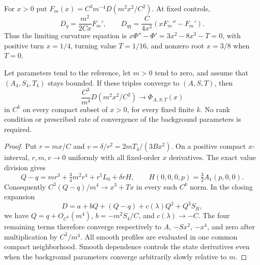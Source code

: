 For $x>0$ put $F_m(x)=C^3m^{-4}D(m^2x^2/C^2)$. At fixed controls,
\[
 D_q=\frac{m^2}{2Cx}F_m',\qquad
 D_{qq}=\frac{C}{4x^3}(xF_m''-F_m').
\]
Thus the limiting curvature equation is
$x\Phi''-\Phi'=3x^2-8x^3-T=0$, with positive turn $x=1/4$,
turning value $T=1/16$, and nonzero root $x=3/8$ when $T=0$.

\begin{lemma}\label{lem:k4-sequence}
Let parameters tend to the reference, let $m>0$ tend to zero, and assume
that $(A_4,S_4,T_4)$ stays bounded. If these triples converge to $(A,S,T)$,
then
\[
 \frac{C^3}{m^4}D(m^2x^2/C^2)\longrightarrow\Phi_{A,S,T}(x)
\]
in $C^k$ on every compact subset of $x>0$, for every fixed finite $k$.
No rank condition or prescribed rate of convergence of the background
parameters is required.
\end{lemma}
\begin{proof}
Put $r=mx/C$ and $v=\delta/r^2=2mT_4/(3Bx^2)$. On a positive compact
$x$-interval, $r,m,v\to0$ uniformly with all fixed-order $x$ derivatives.
The exact value division gives
\[
 Q-q=mr^3+\tfrac34m^2r^4+r^5L_0+\delta rH,
 \qquad H(0,0,0,p)=\tfrac32A_1(p,0,0).
\]
Consequently $C^3(Q-q)/m^4\to x^3+Tx$ in every such $C^k$ norm.
In the closing expansion
\[
 D=a+bQ+(Q-q)+c(\lambda)Q^2+Q^3S_R,
\]
we have $Q=q+O_{C^k}(m^4)$, $b=-m^2S_4/C$, and $c(\lambda)\to-C$.
The four remaining terms therefore converge respectively to
$A$, $-Sx^2$, $-x^4$, and zero after multiplication by $C^3/m^4$.
All smooth profiles are evaluated in one common compact neighborhood.
Smooth dependence controls the state derivatives even when the background
parameters converge arbitrarily slowly relative to $m$.
\end{proof}

